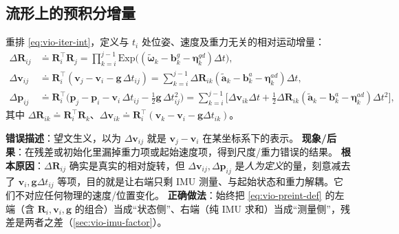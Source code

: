 \subsection{流形上的预积分增量}
\label{sec:vio-preint-delta}

\begin{definition}[预积分相对运动增量]\label{def:vio-delta}
重排 \cref{eq:vio-iter-int}，定义与 $t_i$ 处位姿、速度及重力无关的相对运动增量\cite{forster2017preintegration,carlone2026handbook}：
\begin{equation}
\begin{aligned}
  \Delta\mathbf{R}_{ij}&\doteq\mathbf{R}_i^\top\mathbf{R}_j=\prod_{k=i}^{j-1}\mathrm{Exp}\!\big((\tilde{\boldsymbol{\omega}}_k-\mathbf{b}^g_k-\boldsymbol{\eta}^{gd}_k)\Delta t\big),\\
  \Delta\mathbf{v}_{ij}&\doteq\mathbf{R}_i^\top(\mathbf{v}_j-\mathbf{v}_i-\mathbf{g}\,\Delta t_{ij})=\sum_{k=i}^{j-1}\Delta\mathbf{R}_{ik}(\tilde{\mathbf{a}}_k-\mathbf{b}^a_k-\boldsymbol{\eta}^{ad}_k)\Delta t,\\
  \Delta\mathbf{p}_{ij}&\doteq\mathbf{R}_i^\top\big(\mathbf{p}_j-\mathbf{p}_i-\mathbf{v}_i\,\Delta t_{ij}-\tfrac12\mathbf{g}\,\Delta t_{ij}^2\big)
    =\sum_{k=i}^{j-1}\Big[\Delta\mathbf{v}_{ik}\Delta t+\tfrac12\Delta\mathbf{R}_{ik}(\tilde{\mathbf{a}}_k-\mathbf{b}^a_k-\boldsymbol{\eta}^{ad}_k)\Delta t^2\Big],
\end{aligned}
  \label{eq:vio-preint-def}
\end{equation}
其中 $\Delta\mathbf{R}_{ik}\doteq\mathbf{R}_i^\top\mathbf{R}_k$、$\Delta\mathbf{v}_{ik}\doteq\mathbf{R}_i^\top(\mathbf{v}_k-\mathbf{v}_i-\mathbf{g}\Delta t_{ik})$。
\end{definition}

\begin{pitfall}
\textbf{错误描述}：望文生义，以为 $\Delta\mathbf{v}_{ij}$ 就是 $\mathbf{v}_j-\mathbf{v}_i$ 在某坐标系下的表示。
\textbf{现象/后果}：在残差或初始化里漏掉重力项或起始速度项，得到尺度/重力错误的结果。
\textbf{根本原因}：$\Delta\mathbf{R}_{ij}$ 确实是真实的相对旋转，但 $\Delta\mathbf{v}_{ij},\Delta\mathbf{p}_{ij}$ 是\emph{人为定义}的量，刻意减去了 $\mathbf{v}_i,\mathbf{g}\Delta t_{ij}$ 等项，目的就是让右端只剩 IMU 测量、与起始状态和重力解耦\cite{carlone2026handbook}。它们不对应任何物理的速度/位置变化。
\textbf{正确做法}：始终把 \cref{eq:vio-preint-def} 的左端（含 $\mathbf{R}_i,\mathbf{v}_i,\mathbf{g}$ 的组合）当成“状态侧”、右端（纯 IMU 求和）当成“测量侧”，残差是两者之差（\cref{sec:vio-imu-factor}）。
\end{pitfall}

